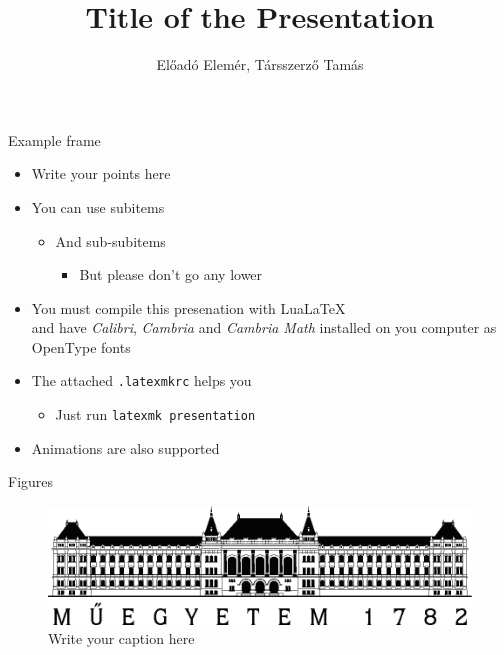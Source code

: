 \documentclass[t,aspectratio=43]{beamer}
\title{Title of the Presentation}
\author{Előadó Elemér, Társszerző Tamás}
\begin{document}
	{
		\begin{frame}
			\titlepage
		\end{frame}
	}
	\addtocounter{framenumber}{-1}
  
\begin{frame}{Example frame}
  \begin{itemize}
  \item Write your points here
  \item You can use subitems
    \begin{itemize}
    \item And sub-subitems
      \begin{itemize}
      \item But please don't go any lower
      \end{itemize}
    \end{itemize}
  \item You must compile this presenation with Lua\LaTeX\\
    and have \emph{Calibri}, \emph{Cambria} and \emph{Cambria Math}
    installed on you computer as OpenType fonts
  \item The attached \texttt{.latexmkrc} helps you
    \begin{itemize}
    \item Just run \texttt{latexmk presentation}
    \end{itemize}
  \item<2-> Animations are also supported
  \end{itemize}
\end{frame}

\begin{frame}[c]{Figures}
  \begin{figure}
    \centering
    \includegraphics[width=\textwidth]{figures/BMElogo.png}
    \caption{Write your caption here}
  \end{figure}
\end{frame}
\end{document}

